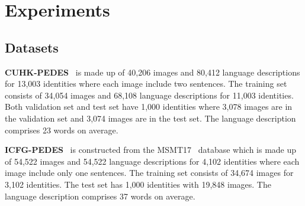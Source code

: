 \section{Experiments}

\subsection{Datasets}
\textbf{CUHK-PEDES}~\cite{li2017person} is made up of 40,206 images and 80,412 language descriptions for 13,003 identities where each image include two sentences. The training set consists of 34,054 images and 68,108 language descriptions for 11,003 identities. Both validation set and test set have 1,000 identities where 3,078 images are in the validation set and 3,074 images are in the test set. The language description comprises 23 words on average.

\textbf{ICFG-PEDES}~\cite{ssan} is constructed from the MSMT17~\cite{MSMT17} database which is made up of 54,522 images and 54,522 language descriptions for 4,102 identities where each image include only one sentences.
The training set consists of 34,674 images for 3,102 identities. The test set has 1,000 identities with 19,848 images.
The language description comprises 37 words on average.

\renewcommand{\multirowsetup}{\centering}
\begin{table*}[t]
\renewcommand\arraystretch{1.06}
    \caption{ \small{The component analysis of \ourmodel. Local means adding  convolution layer to extract local textual feature. SGTL and VGKT are our proposed Semantic-Group Textual Learning Module and Vision-guided Knowledge Transfer Module, respectively.}}\label{tab:ablation}
    \vspace{-2mm}
\footnotesize
    \begin{center}
\end{center}


\end{table*}
